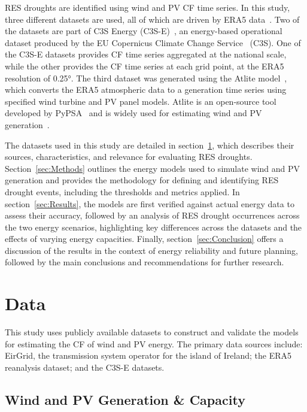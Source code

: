 \documentclass[a4paper, 11pt]{article}
\begin{document}
RES droughts are identified using wind and PV CF time series. In this study, three different datasets are used, all of which are driven by ERA5 data~\cite{hersbach2020era5}. Two of the datasets are part of C3S Energy (C3S-E)~\cite{cds2023energy}, an energy-based operational dataset produced by the EU Copernicus Climate Change Service~\cite{dubus2023energy} (C3S). One of the C3S-E datasets provides CF time series aggregated at the national scale, while the other provides the CF time series at each grid point, at the ERA5 resolution of 0.25°. The third dataset was generated using the Atlite model~\cite{hofman2021atlite}, which converts the  ERA5 atmospheric data to a generation time series using specified wind turbine and PV panel models. Atlite is an open-source tool developed by PyPSA~\cite{hofman2021atlite} and is widely used for estimating wind and PV generation~\cite{mockert2023drought, li2023atlite, parzen2023atlite, ali2023comparative}.



The datasets used in this study are detailed in section~\ref{sec:Data}, which describes their sources, characteristics, and relevance for evaluating RES droughts. Section~\ref{sec:Methods} outlines the energy models used to simulate wind and PV generation and provides the methodology for defining and identifying RES drought events, including the thresholds and metrics applied. In section~\ref{sec:Results}, the models are first verified against actual energy data to assess their accuracy, followed by an analysis of RES drought occurrences across the two energy scenarios, highlighting key differences across the datasets and the effects of varying energy capacities. Finally, section~\ref{sec:Conclusion} offers a discussion of the results in the context of energy reliability and future planning, followed by the main conclusions and recommendations for further research.

\section{Data}
\label{sec:Data}

This study uses publicly available datasets to construct and validate the models for estimating the CF of wind and PV energy. The primary data sources include: EirGrid, the transmission system operator for the island of Ireland; the ERA5 reanalysis dataset; and the C3S-E datasets.

\subsection{Wind and PV Generation \& Capacity}
\label{sec:eirgrid}
\end{document}
